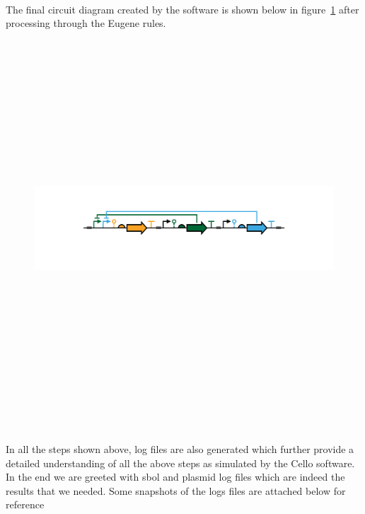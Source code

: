 \documentclass[11pt]{article}
\begin{document}
\\[\baselineskip]   
The final circuit diagram created by the software is shown below in figure~\ref{Circuit diagram} after processing through the Eugene rules.
\begin{figure}[ht!]
\centering
\includegraphics[width=13cm,height=14cm,keepaspectratio]{ex_output.png}
\label{Circuit diagram}
\end{figure}
\\[\baselineskip] 
In all the steps shown above, log files are also generated which further provide a detailed understanding of all the above steps as simulated by the Cello software.
In the end we are greeted with sbol and plasmid log files which are indeed the results that we needed. Some snapshots of the logs files are attached below for reference
 \\[\baselineskip]   
 \\[\baselineskip]   
\end{document}
